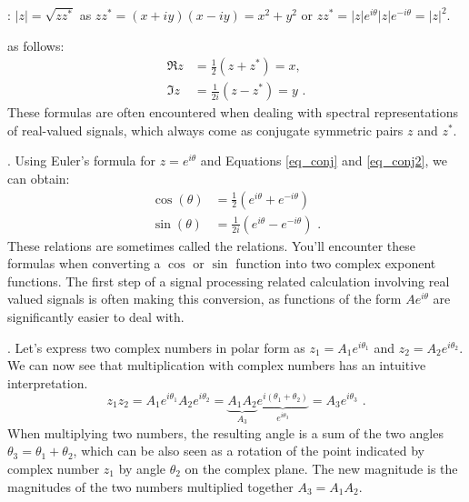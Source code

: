 : $|z| = \sqrt{z z^*}$ as $zz^*=(x+iy)(x-iy)=x^2+y^2$
or $zz^* = |z|e^{i\theta}|z|e^{-i\theta}=|z|^2$.

 as follows:
\begin{align}
\Re{z} &= \frac{1}{2}(z+z^*)=x,  \label{eq_conj} \\
\Im{z} &= \frac{1}{2i}(z-z^*)=y \,\,. \label{eq_conj2}
\end{align}
These formulas are often encountered when dealing with spectral representations of real-valued signals, which always come as conjugate symmetric pairs $z$ and $z^*$.

. Using Euler's formula for $z=e^{i\theta}$ and Equations \ref{eq_conj} and \ref{eq_conj2}, we can obtain:
\begin{align}
\cos(\theta) &= \frac{1}{2}\left(e^{i\theta} + e^{-i\theta}\right) \label{inveul0}\\
\sin(\theta) &= \frac{1}{2i}\left(e^{i\theta} - e^{-i\theta}\right)\,\,. \label{inveul}
\end{align}
These relations are sometimes called the \emph{} relations. You'll encounter these formulas when converting a $\cos$ or $\sin$ function into two complex exponent functions. The first step of a signal processing related calculation involving real valued signals is often making this conversion, as functions of the form $A e^{i\theta}$ are significantly easier to deal with.

. Let's express two complex numbers in polar form as $z_1=A_1e^{i\theta_1}$ and $z_2=A_2e^{i\theta_2}$. We can now see that multiplication with complex numbers has an intuitive interpretation.
\begin{equation}
z_1 z_2 = A_1 e^{i\theta_1} A_2 e^{i\theta_2} = \underbrace{A_1
A_2}_{A_3} \underbrace{e^{i(\theta_1 + \theta_2)}}_{e^{i\theta_3}} =
A_3 e^{i\theta_3} \,\,.
\end{equation}
When multiplying two numbers, the resulting angle is a sum of the two angles $\theta_3=\theta_1 + \theta_2$, which can be also seen as a rotation of the point indicated by complex number $z_1$ by angle $\theta_2$ on the complex plane. The new magnitude is the magnitudes of the two numbers multiplied together $A_3=A_1A_2$.

